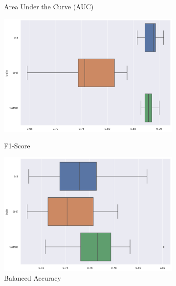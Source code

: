 \documentclass{article}
\theoremstyle{definition}
\begin{document}
\begin{figure}[H]
\begin{subfigure}[b]{0.24\textwidth}
         \caption{Area Under the Curve (AUC)}
         \quad
         \includegraphics[width=\textwidth]{imgs/BreastCancer/Imb/Boxplot_F1S.png}
         \caption{F1-Score}
         \quad
         \includegraphics[width=\textwidth]{imgs/BreastCancer/Imb/Boxplot_BACC.png}
         \caption{Balanced Accuracy}
         \label{Prediction_BreastCancer_Imb2}
     \end{subfigure}
     \hfill
     \begin{subfigure}[b]{0.24\textwidth}
         \centering

\end{subfigure}
\end{figure}
\end{document}
